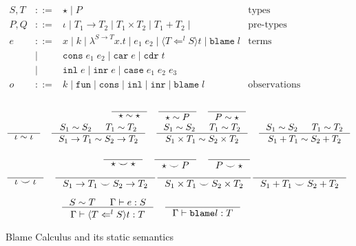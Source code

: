 \documentclass[acmsmall,review,anonymous]{acmart}\settopmatter{printfolios=true,printccs=false,printacmref=false}
\newcommand{\stxrule}[3]{#1 & ::= & #3 & \text{#2}\\}
\newcommand{\stxrulecont}[1]{& | & #1 & \\}
\newcommand{\plus}[0]{+}
\newcommand{\judgetype}[3]{#1 \vdash #2 : #3}
\begin{document}
\begin{figure}
	\[
	\begin{array}{lclr}
	\stxrule{S,T}{types}{
		\star \mid{}
		P
	}
	\stxrule{P,Q}{pre-types}{
		\iota \mid{}
		T_1 \rightarrow T_2 \mid{}
		T_1 \times T_2 \mid{}
		T_1 \plus T_2 \mid{}
	}
	\stxrule{e}{terms}{
		x \mid{}
		k \mid{}
		\lambda^{S\rightarrow{}T}x.t \mid{}
		e_1 \; e_2 \mid{}
		\langle T \Leftarrow^l S \rangle t \mid{}
		\mathtt{blame} \; l
	}
	\stxrulecont{
		\mathtt{cons}\; e_1 \; e_2 \mid{}
		\mathtt{car}\; e \mid{}
		\mathtt{cdr}\; t
	}
	\stxrulecont{
		\mathtt{inl} \; e \mid{}
		\mathtt{inr} \; e \mid{}
		\mathtt{case}\; e_1 \; e_2 \; e_3
	}
	\stxrule{o}{observations}{
		k \mid{}
		\mathtt{fun}\mid{}
		\mathtt{cons}\mid{}
		\mathtt{inl}\mid{}
		\mathtt{inr}\mid{}
		\mathtt{blame}\; l
	}
	\end{array}
	\]
	
	\begin{gather*}
	\inference{}{
		\star \sim \star
	} \quad
	\inference{}{
		\star \sim P
	} \quad
	\inference{}{
		P \sim \star
	} \\
	\inference{}{
		\iota \sim \iota
	} \quad
	\inference{
		S_1 \sim S_2 &
		T_1 \sim T_2
	}{
		S_1 \rightarrow T_1 \sim S_2 \rightarrow T_2
	} \quad
	\inference{
		S_1 \sim S_2 &
		T_1 \sim T_2
	}{
		S_1 \times T_1 \sim S_2 \times T_2
	} \quad
	\inference{
		S_1 \sim S_2 &
		T_1 \sim T_2
	}{
		S_1 \plus T_1 \sim S_2 \plus T_2
	}
	\end{gather*}
	
	\begin{gather*}
	\inference{}{
		\star \smile \star
	} \quad
	\inference{}{
		\star \smile P
	} \quad
	\inference{}{
		P \smile \star
	} \\
	\inference{}{
		\iota \smile \iota
	} \quad
	\inference{}{
		S_1 \rightarrow T_1 \smile S_2 \rightarrow T_2
	}
	\inference{}{
	S_1 \times T_1 \smile S_2 \times T_2
	}
	\inference{}{
	S_1 \plus T_1 \smile S_2 \plus T_2
	}
	\end{gather*}
	
	\begin{gather*}
		\inference{
			S \sim T & \Gamma \vdash e : S 
		}{
			\judgetype{\Gamma}{\langle T \Leftarrow^l S \rangle t}{T}
		} \quad
		\inference{
		}{
			\judgetype{\Gamma}{\mathtt{blame} l}{T}
		}
	\end{gather*}
	
	\caption{Blame Calculus and its static semantics}
	\label{fig:blame-static}
\end{figure}
\end{document}
